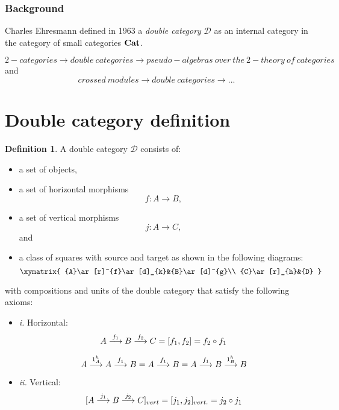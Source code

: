 \documentclass[12pt]{article}
\theoremstyle{plain}
\theoremstyle{definition}
\newtheorem{definition}{Definition}[section]
\numberwithin{equation}{section}
\begin{document}
\subsubsection{Background}

Charles Ehresmann defined in 1963 a {\em double category} $\mathcal{D}$ as an internal category in the category of small categories $\bf{Cat}$.

$$2-categories \to double~categories \to pseudo-algebras ~over~ the ~2-theory~of~ categories $$ and  
$$ crossed ~modules \to double~categories \to ...$$
\section{Double category definition}
\begin{definition}
A double category $\mathcal{D}$ consists of:
\begin{itemize}
\item a set of objects,
\item a set of horizontal morphisms $$f: A \to B,$$
\item a set of vertical morphisms $$j: A \to C,$$ and
\item a class of squares with source and target as shown in the following diagrams: $$\xymatrix{
{A}\ar[r]^{f}\ar[d]_{k}&{B}\ar[d]^{g}\\
{C}\ar[r]_{h}&{D}
}
$$
\end{itemize}

with compositions and units of the double category that satisfy the following axioms:
\begin{itemize}
\item \emph{i.} Horizontal:
\[
A\buildrel f_1 \over \longrightarrow
B \buildrel f_2 \over \longrightarrow
C = [f_1, f_2]= f_2 \circ f_1
\]

\[
A\buildrel 1^h_A \over \longrightarrow
A \buildrel f_1 \over \longrightarrow
B = A\buildrel f_1 \over \longrightarrow
B = A \buildrel f_1 \over \longrightarrow
B \buildrel 1^h_B \over \longrightarrow
B
\]

\item \emph{ii.} Vertical:
\[
[A\buildrel j_1 \over \longrightarrow
B \buildrel j_2 \over \longrightarrow
C]_{vert} = [j_1, j_2]_{vert.}= j_2 \circ j_1
\]


\end{itemize}
\end{definition}
\end{document}
